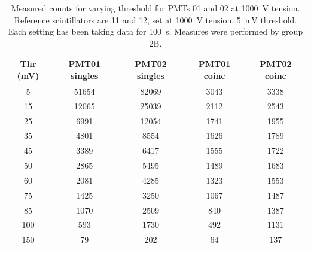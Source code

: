 \documentclass[../main.tex]{subfiles}
\begin{document}
    \begin{table}[b!]
            \centering
            \caption{Measured counts for varying threshold for PMTs 01 and 02 at \SI{1000}{\volt} tension. Reference scintillators are 11 and 12, set at \SI{1000}{\volt} tension, \SI{5}{\milli \volt} threshold. Each setting has been taking data for \SI{100}{\second}. Measures were performed by group 2B.}
            \label{tab:threshold2B}
                \begin{tabular}{|c|cc|cc|}
                    \hline
                    Thr (mV) & PMT01 singles & PMT02 singles & PMT01 coinc & PMT02 coinc \\ \hline
                    \phantom{00}5        & 51654         & 82069         & 3043        & 3338        \\
                    \phantom{0}15       & 12065         & 25039         & 2112        & 2543        \\
                    \phantom{0}25       & \phantom{0}6991          & 12054         & 1741        & 1955        \\
                    \phantom{0}35       & \phantom{0}4801          & \phantom{0}8554          & 1626        & 1789        \\
                    \phantom{0}45       & \phantom{0}3389          & \phantom{0}6417          & 1555        & 1722        \\
                    \phantom{0}50       & \phantom{0}2865          & \phantom{0}5495          & 1489        & 1683        \\
                    \phantom{0}60       & \phantom{0}2081          & \phantom{0}4285          & 1323        & 1553        \\
                    \phantom{0}75       & \phantom{0}1425          & \phantom{0}3250          & 1067        & 1487        \\
                    \phantom{0}85       & \phantom{0}1070          & \phantom{0}2509          & \phantom{0}840         & 1387        \\
                    100      & \phantom{00}593           & \phantom{0}1730          & \phantom{0}492         & 1131        \\
                    150      & \phantom{000}79            & \phantom{00}202           & \phantom{00}64          & \phantom{0}137         \\ \hline
                \end{tabular}
        \end{table}
\end{document}
